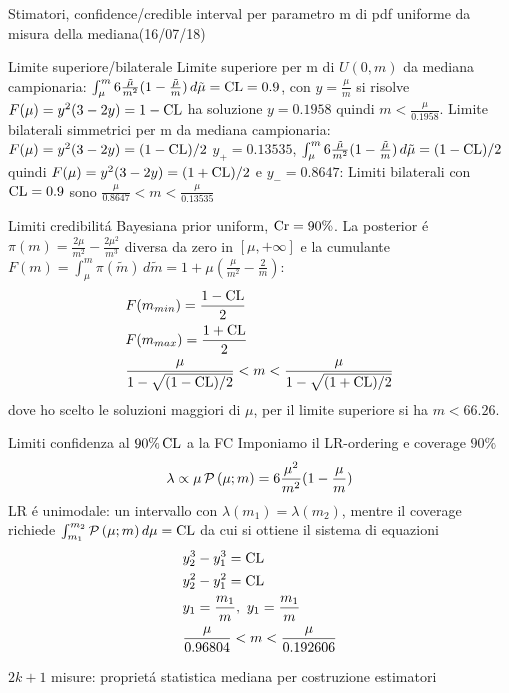 \begin{wordonframe}{Stimatori, confidence/credible interval per parametro m di pdf uniforme da misura della mediana(16/07/18)}
	\begin{block}{Limite superiore/bilaterale}
		Limite superiore per m di $U(0,m)$ da mediana campionaria: $\int_{\mu}^m6\frac{\tilde{\mu}}{m^2}(1-\frac{\tilde{\mu}}{m})\,d\tilde{\mu}=\operatorname{CL}=0.9$, con $y=\frac{\mu}{m}$ si risolve $F(\mu)=y^2(3-2y)=1-\operatorname{CL}$ ha soluzione $y=0.1958$ quindi $m<\frac{\mu}{0.1958}$.
		Limite bilaterali simmetrici per m da mediana campionaria: $F(\mu)=y^2(3-2y)=(1-\operatorname{CL})/2$ $y_+=0.13535$, $\int_{\mu}^m6\frac{\tilde{\mu}}{m^2}(1-\frac{\tilde{\mu}}{m})\,d\tilde{\mu}=(1-\operatorname{CL})/2$ quindi $F(\mu)=y^2(3-2y)=(1+\operatorname{CL})/2$ e $y_-=0.8647$: Limiti bilaterali con $\operatorname{CL}=0.9$ sono $\frac{\mu}{0.8647}<m<\frac{\mu}{0.13535}$
	\end{block}
	\begin{block}{Limiti credibilit\'a Bayesiana}
		prior uniform, $\operatorname{Cr}=90\%$. La posterior \'e $\pi(m)=\frac{2\mu}{m^2}-\frac{2\mu^2}{m^3}$ diversa da zero in $[\mu,+\infty]$ e la cumulante $F(m)=\int_{\mu}^m\pi(\tilde{m})\,d\tilde{m}=1+\mu(\frac{\mu}{m^2}-\frac{2}{m})$:
		\begin{align*}
		&F(m_{min})=\frac{1-\operatorname{CL}}{2}\\
		&F(m_{max})=\frac{1+\operatorname{CL}}{2}\\
		&\frac{\mu}{1-\sqrt{(1-\operatorname{CL})/2}}<m<\frac{\mu}{1-\sqrt{(1+\operatorname{CL})/2}}
		\end{align*}
		dove ho scelto le soluzioni maggiori di $\mu$, per il limite superiore si ha $m<66.26$.
	\end{block}
	\begin{block}{Limiti confidenza al $90\%\operatorname{CL}$ a la FC}
		Imponiamo il LR-ordering e coverage $90\%$
		\begin{equation*}
		\lambda\propto\mu\operatorname{\mathcal{P}}{(\mu;m)}=6\frac{\mu^2}{m^2}(1-\frac{\mu}{m})
		\end{equation*}
		LR \'e unimodale: un intervallo con $\lambda(m_1)=\lambda(m_2)$, mentre il coverage richiede $\int_{m_1}^{m_2}\operatorname{\mathcal{P}}{(\mu;m)}\,d\mu=\operatorname{CL}$ da cui si ottiene il sistema di equazioni
		\begin{align*}
		&y_2^3-y_1^3=\operatorname{CL}\\
		&y_2^2-y_1^2=\operatorname{CL}\\
		&y_1=\frac{m_1}{m},\ y_1=\frac{m_1}{m}\\
		&\frac{\mu}{0.96804}<m<\frac{\mu}{0.192606}
		\end{align*}
	\end{block}
	\begin{block}{$2k+1$ misure: propriet\'a statistica mediana per costruzione estimatori}

\end{block}
\end{wordonframe}
